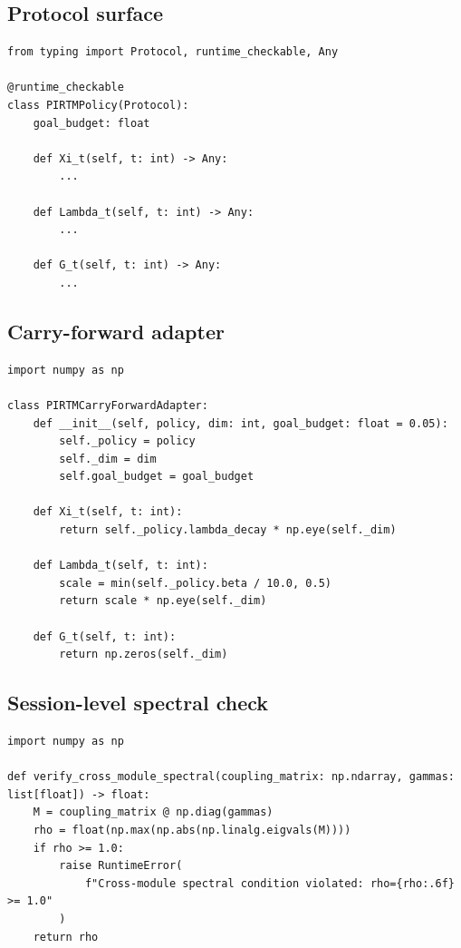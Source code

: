 \documentclass[11pt]{article}
\begin{document}
\subsection{Protocol surface}

\begin{lstlisting}[style=py,caption={Proposed PIRTM policy protocol}]
from typing import Protocol, runtime_checkable, Any

@runtime_checkable
class PIRTMPolicy(Protocol):
    goal_budget: float

    def Xi_t(self, t: int) -> Any:
        ...

    def Lambda_t(self, t: int) -> Any:
        ...

    def G_t(self, t: int) -> Any:
        ...
\end{lstlisting}

\subsection{Carry-forward adapter}

\begin{lstlisting}[style=py,caption={Adapter from carry-forward semantics to recurrence semantics}]
import numpy as np

class PIRTMCarryForwardAdapter:
    def __init__(self, policy, dim: int, goal_budget: float = 0.05):
        self._policy = policy
        self._dim = dim
        self.goal_budget = goal_budget

    def Xi_t(self, t: int):
        return self._policy.lambda_decay * np.eye(self._dim)

    def Lambda_t(self, t: int):
        scale = min(self._policy.beta / 10.0, 0.5)
        return scale * np.eye(self._dim)

    def G_t(self, t: int):
        return np.zeros(self._dim)
\end{lstlisting}

\subsection{Session-level spectral check}

\begin{lstlisting}[style=py,caption={Proposed hybrid session global stability check}]
import numpy as np

def verify_cross_module_spectral(coupling_matrix: np.ndarray, gammas: list[float]) -> float:
    M = coupling_matrix @ np.diag(gammas)
    rho = float(np.max(np.abs(np.linalg.eigvals(M))))
    if rho >= 1.0:
        raise RuntimeError(
            f"Cross-module spectral condition violated: rho={rho:.6f} >= 1.0"
        )
    return rho
\end{lstlisting}
\end{document}
